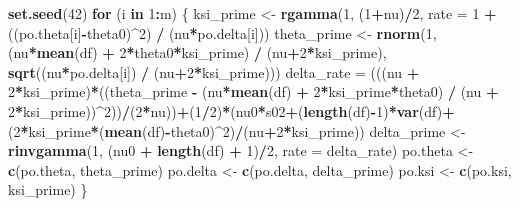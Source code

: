 \documentclass[
]{article}
\newenvironment{Shaded}{\begin{snugshade}}{\end{snugshade}}
\newcommand{\AttributeTok}[1]{\textcolor[rgb]{0.13,0.29,0.53}{#1}}
\newcommand{\ControlFlowTok}[1]{\textcolor[rgb]{0.13,0.29,0.53}{\textbf{#1}}}
\newcommand{\DecValTok}[1]{\textcolor[rgb]{0.00,0.00,0.81}{#1}}
\newcommand{\FunctionTok}[1]{\textcolor[rgb]{0.13,0.29,0.53}{\textbf{#1}}}
\newcommand{\NormalTok}[1]{#1}
\newcommand{\OtherTok}[1]{\textcolor[rgb]{0.56,0.35,0.01}{#1}}
\newcommand{\SpecialCharTok}[1]{\textcolor[rgb]{0.81,0.36,0.00}{\textbf{#1}}}
\begin{document}
\begin{Shaded}
\begin{Highlighting}[]
\FunctionTok{set.seed}\NormalTok{(}\DecValTok{42}\NormalTok{)}
\ControlFlowTok{for}\NormalTok{ (i }\ControlFlowTok{in} \DecValTok{1}\SpecialCharTok{:}\NormalTok{m) \{}
\NormalTok{  ksi\_prime }\OtherTok{\textless{}{-}} \FunctionTok{rgamma}\NormalTok{(}\DecValTok{1}\NormalTok{, (}\DecValTok{1}\SpecialCharTok{+}\NormalTok{nu)}\SpecialCharTok{/}\DecValTok{2}\NormalTok{, }\AttributeTok{rate =} \DecValTok{1} \SpecialCharTok{+}\NormalTok{ ((po.theta[i]}\SpecialCharTok{{-}}\NormalTok{theta0)}\SpecialCharTok{\^{}}\DecValTok{2}\NormalTok{) }\SpecialCharTok{/}\NormalTok{ (nu}\SpecialCharTok{*}\NormalTok{po.delta[i]))}
\NormalTok{  theta\_prime }\OtherTok{\textless{}{-}} \FunctionTok{rnorm}\NormalTok{(}\DecValTok{1}\NormalTok{, (nu}\SpecialCharTok{*}\FunctionTok{mean}\NormalTok{(df) }\SpecialCharTok{+} \DecValTok{2}\SpecialCharTok{*}\NormalTok{theta0}\SpecialCharTok{*}\NormalTok{ksi\_prime) }\SpecialCharTok{/}\NormalTok{ (nu}\SpecialCharTok{+}\DecValTok{2}\SpecialCharTok{*}\NormalTok{ksi\_prime), }\FunctionTok{sqrt}\NormalTok{((nu}\SpecialCharTok{*}\NormalTok{po.delta[i]) }\SpecialCharTok{/}\NormalTok{ (nu}\SpecialCharTok{+}\DecValTok{2}\SpecialCharTok{*}\NormalTok{ksi\_prime)))}
\NormalTok{  delta\_rate }\OtherTok{=}\NormalTok{ (((nu }\SpecialCharTok{+} \DecValTok{2}\SpecialCharTok{*}\NormalTok{ksi\_prime)}\SpecialCharTok{*}\NormalTok{((theta\_prime }\SpecialCharTok{{-}}\NormalTok{ (nu}\SpecialCharTok{*}\FunctionTok{mean}\NormalTok{(df) }\SpecialCharTok{+} \DecValTok{2}\SpecialCharTok{*}\NormalTok{ksi\_prime}\SpecialCharTok{*}\NormalTok{theta0) }\SpecialCharTok{/}\NormalTok{ (nu }\SpecialCharTok{+} \DecValTok{2}\SpecialCharTok{*}\NormalTok{ksi\_prime))}\SpecialCharTok{\^{}}\DecValTok{2}\NormalTok{))}\SpecialCharTok{/}\NormalTok{(}\DecValTok{2}\SpecialCharTok{*}\NormalTok{nu))}\SpecialCharTok{+}\NormalTok{(}\DecValTok{1}\SpecialCharTok{/}\DecValTok{2}\NormalTok{)}\SpecialCharTok{*}\NormalTok{(nu0}\SpecialCharTok{*}\NormalTok{s02}\SpecialCharTok{+}\NormalTok{(}\FunctionTok{length}\NormalTok{(df)}\SpecialCharTok{{-}}\DecValTok{1}\NormalTok{)}\SpecialCharTok{*}\FunctionTok{var}\NormalTok{(df)}\SpecialCharTok{+}\NormalTok{(}\DecValTok{2}\SpecialCharTok{*}\NormalTok{ksi\_prime}\SpecialCharTok{*}\NormalTok{(}\FunctionTok{mean}\NormalTok{(df)}\SpecialCharTok{{-}}\NormalTok{theta0)}\SpecialCharTok{\^{}}\DecValTok{2}\NormalTok{)}\SpecialCharTok{/}\NormalTok{(nu}\SpecialCharTok{+}\DecValTok{2}\SpecialCharTok{*}\NormalTok{ksi\_prime))}
\NormalTok{  delta\_prime }\OtherTok{\textless{}{-}} \FunctionTok{rinvgamma}\NormalTok{(}\DecValTok{1}\NormalTok{, (nu0 }\SpecialCharTok{+} \FunctionTok{length}\NormalTok{(df) }\SpecialCharTok{+} \DecValTok{1}\NormalTok{)}\SpecialCharTok{/}\DecValTok{2}\NormalTok{, }\AttributeTok{rate =}\NormalTok{ delta\_rate)}
\NormalTok{  po.theta }\OtherTok{\textless{}{-}} \FunctionTok{c}\NormalTok{(po.theta, theta\_prime)}
\NormalTok{  po.delta }\OtherTok{\textless{}{-}} \FunctionTok{c}\NormalTok{(po.delta, delta\_prime)}
\NormalTok{  po.ksi }\OtherTok{\textless{}{-}} \FunctionTok{c}\NormalTok{(po.ksi, ksi\_prime)}
\NormalTok{\}}


\end{Highlighting}
\end{Shaded}
\end{document}
